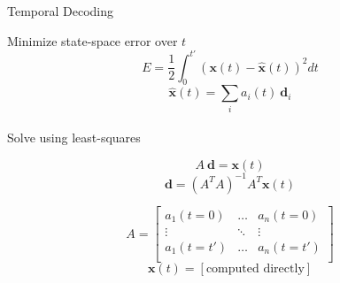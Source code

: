 \documentclass[aspectratio=169]{beamer}
\begin{document}
\begin{frame}{Temporal Decoding}
\begin{multicols}{2}
\centering
Minimize state-space error over $t$
\begin{equation*}
    E = \frac{1}{2}\int_{0}^{t'} (\mathbf{x}(t) - \hat{\mathbf{x}}(t))^2 dt
\end{equation*}
\begin{equation*}
    \hat{\mathbf{x}}(t) = \sum_i a_i(t) ~\mathbf{d}_i
\end{equation*} \\
\columnbreak
Solve using least-squares \\
\vspace{0.25cm}
\begin{minipage}{0.5\textwidth}
\begin{equation*}
    A ~\mathbf{d} = \mathbf{x}(t)
\end{equation*}
\begin{equation*}
    \mathbf{d} = (A^T A)^{-1} A^T \mathbf{x}(t)
\end{equation*}
\end{minipage}
\end{multicols}
\pause
{}
\begin{equation*}
    A = \begin{bmatrix}
    a_{1}(t=0) & \dots & a_{n}(t=0) \\
    \vdots & \ddots & \vdots \\
    a_{1}(t=t') & \dots & a_{n}(t=t') \\
    \end{bmatrix}
\end{equation*}
\begin{equation*}
    \mathbf{x}(t) = [\text{computed directly}]
\end{equation*}
\end{frame}
\end{document}

